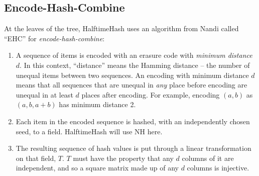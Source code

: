 \documentclass[sigconf, nonacm]{acmart}
\begin{document}


\subsection{Encode-Hash-Combine}

At the leaves of the tree, HalftimeHash uses an algorithm from Nandi called ``EHC'' for {\em encode-hash-combine}: \cite{ehc-nandi}

\begin{enumerate}
\item A sequence of items is encoded with an erasure code with {\em minimum distance $d$}.
  In this context, ``distance'' means the Hamming distance -- the number of unequal items between two sequences.
  An encoding with minimum distance $d$ means that all sequences that are unequal in {\em any} place before encoding are unequal in at least $d$ places after encoding.
  For example, encoding $(a,b)$ as $(a,b,a+b)$ has minimum distance 2.
\item Each item in the encoded sequence is hashed, with an independently chosen seed, to a field.
  HalftimeHash will use NH here. %
\item The resulting sequence of hash values is put through a linear transformation on that field, $T$.
  $T$ must have the property that any $d$ columns of it are independent, and so a square matrix made up of any $d$ columns is injective.
\end{enumerate}


\end{document}
